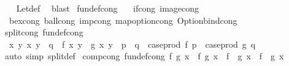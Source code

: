 \begin{isabellebody}
%
\isadelimproof
\ \ %
\endisadelimproof
%
\isatagproof
{}\isamarkupfalse%
\ Let{\isacharunderscore}{\kern0pt}def\ \isamarkupfalse%
\ blast%
\endisatagproof
{\isafoldproof}%
%
\isadelimproof
\isanewline
%
\endisadelimproof
\isanewline
{}\isamarkupfalse%
\ {\isacharbrackleft}{\kern0pt}fundef{\isacharunderscore}{\kern0pt}cong{\isacharbrackright}{\kern0pt}\ {\isacharequal}{\kern0pt}\isanewline
\ \ if{\isacharunderscore}{\kern0pt}cong\ image{\isacharunderscore}{\kern0pt}cong\isanewline
\ \ bex{\isacharunderscore}{\kern0pt}cong\ ball{\isacharunderscore}{\kern0pt}cong\ imp{\isacharunderscore}{\kern0pt}cong\ map{\isacharunderscore}{\kern0pt}option{\isacharunderscore}{\kern0pt}cong\ Option{\isachardot}{\kern0pt}bind{\isacharunderscore}{\kern0pt}cong\isanewline
\isanewline
{}\isamarkupfalse%
\ split{\isacharunderscore}{\kern0pt}cong\ {\isacharbrackleft}{\kern0pt}fundef{\isacharunderscore}{\kern0pt}cong{\isacharbrackright}{\kern0pt}{\isacharcolon}{\kern0pt}\isanewline
\ \ {\isachardoublequoteopen}{\isacharparenleft}{\kern0pt}{\isasymAnd}x\ y{\isachardot}{\kern0pt}\ {\isacharparenleft}{\kern0pt}x{\isacharcomma}{\kern0pt}\ y{\isacharparenright}{\kern0pt}\ {\isacharequal}{\kern0pt}\ q\ {\isasymLongrightarrow}\ f\ x\ y\ {\isacharequal}{\kern0pt}\ g\ x\ y{\isacharparenright}{\kern0pt}\ {\isasymLongrightarrow}\ p\ {\isacharequal}{\kern0pt}\ q\ {\isasymLongrightarrow}\ case{\isacharunderscore}{\kern0pt}prod\ f\ p\ {\isacharequal}{\kern0pt}\ case{\isacharunderscore}{\kern0pt}prod\ g\ q{\isachardoublequoteclose}\isanewline
%
\isadelimproof
\ \ %
\endisadelimproof
%
\isatagproof
{}\isamarkupfalse%
\ {\isacharparenleft}{\kern0pt}auto\ simp{\isacharcolon}{\kern0pt}\ split{\isacharunderscore}{\kern0pt}def{\isacharparenright}{\kern0pt}%
\endisatagproof
{\isafoldproof}%
%
\isadelimproof
\isanewline
%
\endisadelimproof
\isanewline
{}\isamarkupfalse%
\ comp{\isacharunderscore}{\kern0pt}cong\ {\isacharbrackleft}{\kern0pt}fundef{\isacharunderscore}{\kern0pt}cong{\isacharbrackright}{\kern0pt}{\isacharcolon}{\kern0pt}\ {\isachardoublequoteopen}f\ {\isacharparenleft}{\kern0pt}g\ x{\isacharparenright}{\kern0pt}\ {\isacharequal}{\kern0pt}\ f{\isacharprime}{\kern0pt}\ {\isacharparenleft}{\kern0pt}g{\isacharprime}{\kern0pt}\ x{\isacharprime}{\kern0pt}{\isacharparenright}{\kern0pt}\ {\isasymLongrightarrow}\ {\isacharparenleft}{\kern0pt}f\ {\isasymcirc}\ g{\isacharparenright}{\kern0pt}\ x\ {\isacharequal}{\kern0pt}\ {\isacharparenleft}{\kern0pt}f{\isacharprime}{\kern0pt}\ {\isasymcirc}\ g{\isacharprime}{\kern0pt}{\isacharparenright}{\kern0pt}\ x{\isacharprime}{\kern0pt}{\isachardoublequoteclose}\isanewline

\end{isabellebody}

